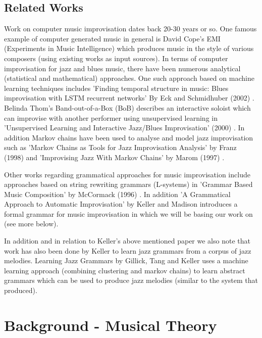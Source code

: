 \documentclass[pdftex,12pt,a4paper]{report}
\begin{document}
\section{Related Works}
Work on computer music improvisation dates back 20-30 years or so. One famous example of computer generated music in general is David Cope's EMI (Experiments in Music Intelligence) which produces music in the style of various composers (using existing works as input sources). In terms of computer improvisation for jazz and blues music, there have been numerous analytical (statistical and mathematical) approaches. One such approach based on machine learning techniques includes 'Finding temporal structure in music: Blues improvisation with LSTM recurrent networks' By Eck and Schmidhuber (2002) \cite{eck02}. Belinda Thom's Band-out-of-a-Box (BoB) describes an interactive soloist which can improvise with another performer using unsupervised learning in 'Unsupervised Learning and Interactive Jazz/Blues Improvisation' (2000) \cite{thom2000}. In addition Markov chains have been used to analyse and model jazz improvisation such as 'Markov Chains as Tools for Jazz Improvisation Analysis' by Franz (1998) \cite{franz98} and 'Improvising Jazz With Markov Chains' by Marom (1997) \cite{marom97}.

Other works regarding grammatical approaches for music improvisation include approaches based on string rewriting grammars (L-systems) in 'Grammar Based Music Composition' by McCormack (1996) \cite{mccormack96}. In addition 'A Grammatical Approach to Automatic Improvisation' by Keller and Madison \cite{keller07} introduces a formal grammar for music improvisation in which we will be basing our work on (see more below).

In addition and in relation to Keller's above mentioned paper \cite{keller07} we also note that work has also been done by Keller to learn jazz grammars from a corpus of jazz melodies. Learning Jazz Grammars by Gillick, Tang and Keller \cite{kellergillick09} uses a machine learning approach (combining clustering and markov chains) to learn abstract grammars which can be used to produce jazz melodies (similar to the system that \cite{keller07} produced). 


\pagebreak

\chapter{Background - Musical Theory}
\end{document}
